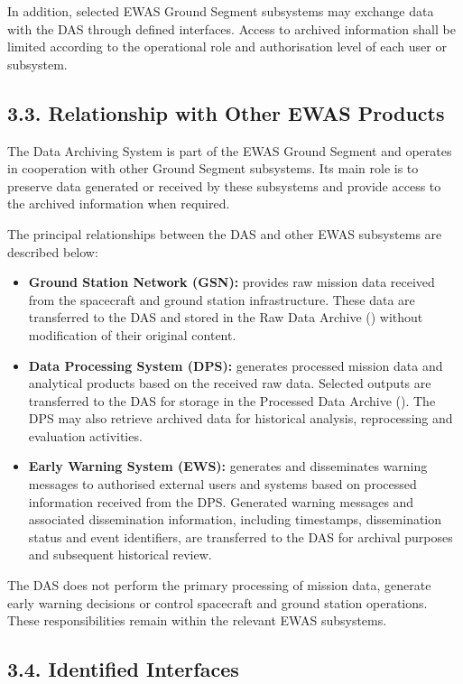 In addition, selected EWAS Ground Segment subsystems may exchange data with the DAS through defined interfaces. Access to archived information shall be limited according to the operational role and authorisation level of each user or subsystem.

\subsection{3.3. Relationship with Other EWAS Products}\label{relationships-with-ewas-products}

The Data Archiving System is part of the EWAS Ground Segment and operates in cooperation with other Ground Segment subsystems. Its main role is to preserve data generated or received by these subsystems and provide access to the archived information when required.

The principal relationships between the DAS and other EWAS subsystems are described below:

\begin{itemize}
    \item \textbf{Ground Station Network (GSN):} provides raw mission data received from the spacecraft and ground station infrastructure. These data are transferred to the DAS and stored in the Raw Data Archive () without modification of their original content.
    \item \textbf{Data Processing System (DPS):} generates processed mission data and analytical products based on the received raw data. Selected outputs are transferred to the DAS for storage in the Processed Data Archive (). The DPS may also retrieve archived data for historical analysis, reprocessing and evaluation activities.
    \item \textbf{Early Warning System (EWS):} generates and disseminates warning messages to authorised external users and systems based on processed information received from the DPS. Generated warning messages and associated dissemination information, including timestamps, dissemination status and event identifiers, are transferred to the DAS for archival purposes and subsequent historical review.
\end{itemize}

The DAS does not perform the primary processing of mission data, generate early warning decisions or control spacecraft and ground station operations. These responsibilities remain within the relevant EWAS subsystems.

\subsection{3.4. Identified Interfaces}\label{identified-interfaces}

